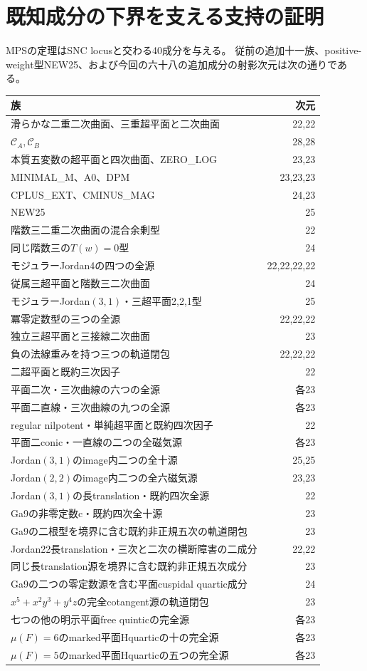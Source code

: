 \documentclass[a4paper,11pt]{ltjsarticle}
\theoremstyle{definition}
\begin{document}
\section{既知成分の下界を支える支持の証明}
MPSの定理\cite[Theorem 1.4]{mps}はSNC locusと交わる40成分を与える。
従前の追加十一族、positive-weight型NEW25、および今回の六十八の追加成分の射影次元は次の通りである。
\begin{center}
\begin{tabular}{lr}
\toprule
族&次元\\\midrule
滑らかな二重二次曲面、三重超平面と二次曲面&22,22\\
$\mathcal C_A,\mathcal C_B$&28,28\\
本質五変数の超平面と四次曲面、ZERO\_LOG&23,23\\
MINIMAL\_M、A0、DPM&23,23,23\\
CPLUS\_EXT、CMINUS\_MAG&24,23\\
NEW25&25\\
階数三二重二次曲面の混合余剰型&22\\
同じ階数三の$T(w)=0$型&24\\
モジュラーJordan4の四つの全源&22,22,22,22\\
従属三超平面と階数三二次曲面&24\\
モジュラーJordan$(3,1)$・三超平面2,2,1型&25\\
冪零定数型の三つの全源&22,22,22\\
独立三超平面と三接線二次曲面&23\\
負の法線重みを持つ三つの軌道閉包&22,22,22\\
二超平面と既約三次因子&22\\
平面二次・三次曲線の六つの全源&各23\\
平面二直線・三次曲線の九つの全源&各23\\
regular nilpotent・単純超平面と既約四次因子&22\\
平面二conic・一直線の二つの全磁気源&各23\\
Jordan$(3,1)$のimage内二つの全十源&25,25\\
Jordan$(2,2)$のimage内二つの全六磁気源&23,23\\
Jordan$(3,1)$の長translation・既約四次全源&22\\
Ga9の非零定数c・既約四次全十源&23\\
Ga9の二根型を境界に含む既約非正規五次の軌道閉包&23\\
Jordan22長translation・三次と二次の横断障害の二成分&22,22\\
同じ長translation源を境界に含む既約非正規五次成分&23\\
Ga9の二つの零定数源を含む平面cuspidal quartic成分&24\\
$x^5+x^2y^3+y^4z$の完全cotangent源の軌道閉包&23\\
七つの他の明示平面free quinticの完全源&各23\\
$\mu(F)=6$のmarked平面Hquarticの十の完全源&各23\\
$\mu(F)=5$のmarked平面Hquarticの五つの完全源&各23\\\bottomrule
\end{tabular}
\end{center}
\end{document}
